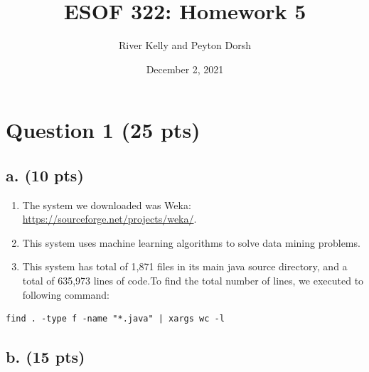 \documentclass[12pt]{article}
\title{ESOF 322: Homework 5}
\author{River Kelly and Peyton Dorsh}
\date{December 2, 2021}
\begin{document}
\maketitle

\newpage
\section*{Question 1 (25 pts)}

\subsection*{a. (10 pts)}
\begin{enumerate}
    \item The system we downloaded was Weka: \url{https://sourceforge.net/projects/weka/}.
    \item This system uses machine learning algorithms to solve data mining problems.
    \item This system has total of 1,871 files in its main java source directory, and a total of 635,973 lines of code.\newline To find the total number of lines, we executed to following command:
\end{enumerate}
\begin{lstlisting}
find . -type f -name "*.java" | xargs wc -l
\end{lstlisting}

\newpage
\subsection*{b. (15 pts)}
\end{document}
